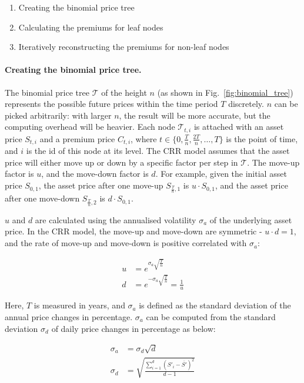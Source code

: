 \begin{enumerate}
    \item Creating the binomial price tree
    \item Calculating the premiums for leaf nodes
    \item Iteratively reconstructing the premiums for non-leaf nodes 
\end{enumerate}

\paragraph{Creating the binomial price tree.}
The binomial price tree $\mathcal{T}$ of the height $n$ (as shown in Fig.~\ref{fig:binomial_tree}) represents the possible future prices within the time period $T$ discretely.
$n$ can be picked arbitrarily: with larger $n$, the result will be more accurate, but the computing overhead will be heavier.
Each node $\mathcal{T}_{t, i}$ is attached with an asset price $S_{t, i}$ and a premium price $C_{t, i}$,
where $t \in \{0, \frac{T}{n}, \frac{2T}{n}, \dots, T\}$ is the point of time, and $i$ is the id of this node at its level.
The CRR model assumes that the asset price will either move up or down by a specific factor per step in $\mathcal{T}$.
The move-up factor is $u$, and the move-down factor is $d$.
For example, given the initial asset price $S_{0, 1}$, the asset price after one move-up $S_{\frac{T}{n}, 1}$ is $u \cdot S_{0, 1}$, and the asset price after one move-down $S_{\frac{T}{n}, 2}$ is $d \cdot S_{0, 1}$.

$u$ and $d$ are calculated using the annualised volatility $\sigma_a$ of the underlying asset price.
In the CRR model, the move-up and move-down are symmetric - $u \cdot d = 1$, and the rate of move-up and move-down is positive correlated with $\sigma_a$:

\begin{align} 
u &= e^{\sigma_a \sqrt{\frac{T}{n}}}\\
d &= e^{- \sigma_a \sqrt{\frac{T}{n}}} = \frac{1}{u}
\end{align}

Here, $T$ is measured in years, and $\sigma_a$ is defined as the standard deviation of the annual price changes in percentage.
$\sigma_a$ can be computed from the standard deviation $\sigma_d$ of daily price changes in percentage as below:

\begin{align} 
\sigma_a &= \sigma_d \sqrt{d}\\
\sigma_d &= \sqrt{\frac{\sum^{d}_{i=1} (S'_i - \bar{S'})^2}{d-1}}
\end{align}

